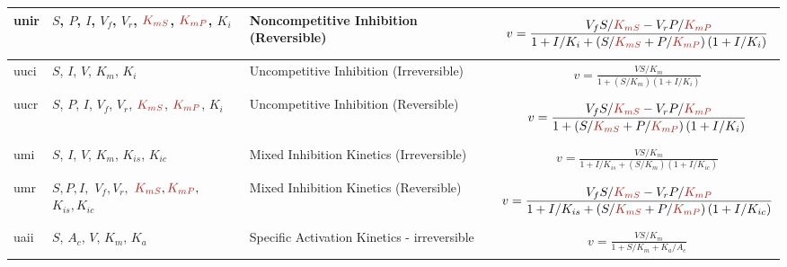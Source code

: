 \documentclass[10pt]{cekarticle}
\newcommand{\changed}[1]{\textcolor{BrickRed}{#1}}
\newenvironment{blockChanged}{\color{BrickRed}}{}
\begin{document}
\begin{table}[ht]
\begin{tabular}{|p{0.5in}|>{\raggedright}m{0.77in}|>{\raggedright}m{1.5in}|m{3in}|}
unir & $S$, $P$, $I$, $V_f$, \changed{$V_r$}, $\changed{K_{mS}}$, $\changed{K_{mP}}$, $K_i$ & Noncompetitive
Inhibition (Reversible) &
\begin{gather*}
v = \frac{V_f S/\changed{K_{mS}} - V_r P/\changed{K_{mP}}}{1 +
  I/K_i + \left( S/\changed{K_{mS}} + P/\changed{K_{mP}} \right) \left( 1 + I/K_i\right) }
\end{gather*}
\\ \hline

uuci & $S$, $I$, $V$, $K_m$, $K_i$ & Uncompetitive Inhibition
(Irreversible) &
\begin{blockChanged}
\begin{gather*}
v = \frac{V S/K_m}{1 + \left( S/K_m \right) \left( 1 + I/K_i\right)}
\end{gather*}
\end{blockChanged}
\\ \hline

uucr & $S$, $P$, $I$, $V_f$, $V_r$, $\changed{K_{mS}}$, $\changed{K_{mP}}$, $K_i$ &
Uncompetitive Inhibition (Reversible) &
\begin{gather*}
v = \frac{V_f S/\changed{K_{mS}} - V_r
P/\changed{K_{mP}}}{1 + \left( S/\changed{K_{mS}} + P/\changed{K_{mP}} \right) \left( 1 + I/K_i\right) }
\end{gather*}
\\ \hline

umi & $S$, $I$, $V$, $K_m$, $K_{is}$, $K_{ic}$ & Mixed Inhibition
Kinetics (Irreversible) &
\begin{blockChanged}
\begin{gather*}
v = \frac{V S/K_m}{1 + I/K_{is} + \left( S/K_m \right) \left( 1 + I/K_{ic} \right) }
\end{gather*}
\end{blockChanged}
\\ \hline

umr & $ S, P, I,$ $ V_f, V_r, $ $ \changed{K_{mS}}, \changed{K_{mP}}, $ $ K_{is}, K_{ic} $ & Mixed
Inhibition Kinetics (Reversible) &
\begin{gather*}
v = \frac{V_f S/\changed{K_{mS}} - V_r
P/\changed{K_{mP}}}{1 + I/K_{is} + \left( S/\changed{K_{mS}} + P/\changed{K_{mP}} \right) \left( 1 + I/K_{ic}
\right) }
\end{gather*}
\\ \hline

\changed{uaii} & $S$, $A_c$, $V$, $K_m$, $K_a$ & Specific Activation Kinetics -
irreversible &
\begin{gather*}
v = \frac{V S/K_m}{1 + S/K_m + K_a/A_c}
\end{gather*}
\\ \hline


\end{tabular}
\end{table}
\end{document}
